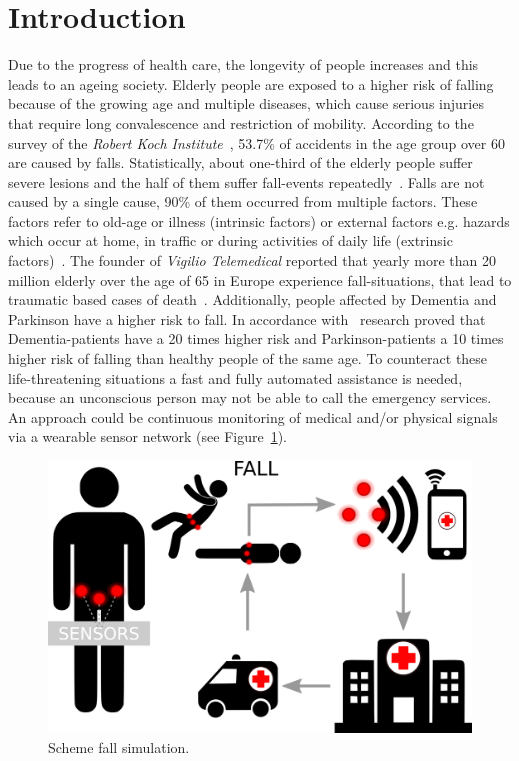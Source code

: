\documentclass[conference]{IEEEtran}
\theoremstyle{definition}
\begin{document}
\IEEEpeerreviewmaketitle

\section{Introduction}

Due to the progress of health care, the longevity of people increases and this leads to an ageing society. Elderly people are exposed 
to a higher risk of falling because of the growing age and multiple diseases, which cause serious injuries that require long convalescence 
and restriction of mobility. According to the survey of the \textit{Robert Koch Institute}~\cite{Varnaccia2013}, 53.7\% of accidents in the age 
group over 60 are caused by falls. Statistically, about one-third of the elderly people suffer severe lesions and the half of them suffer 
fall-events repeatedly~\cite{Schott2008}. Falls are not caused by a single cause, 90\% of them occurred from multiple factors. These 
factors refer to old-age or illness (intrinsic factors) or external factors e.g. hazards which occur at home, in traffic or during activities 
of daily life (extrinsic factors)~\cite{Schott2008}. The founder of \textit{Vigilio Telemedical} reported that yearly more than 20 million 
elderly over the age of 65 in Europe experience fall-situations, that lead to traumatic based cases of death~\cite{Vigilio,APAOTS2013}. 
Additionally, people affected by Dementia and Parkinson have a higher risk to fall. In accordance with~\cite{Monks} research proved that 
Dementia-patients have a 20 times higher risk and Parkinson-patients a 10 times higher risk of falling than healthy people of the same age. 
To counteract these life-threatening situations a fast and fully automated assistance is needed, because an unconscious person may not be 
able to call the emergency services. An approach could be continuous monitoring of medical and/or physical signals via a wearable sensor 
network (see Figure~\ref{fig:simulation}). 

\begin{figure}[!h]
  \centering
  \includegraphics[scale=0.2]{img/Figure1}
  \caption[Escalation scheme]{Scheme fall simulation.}
  \label{fig:simulation}
\end{figure}
\end{document}
